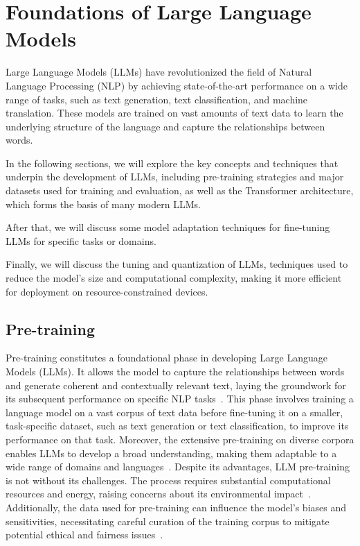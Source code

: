 
\section{Foundations of Large Language Models}
\label{ch:foundations-of-large-language-models}


Large Language Models (LLMs) have revolutionized the field of Natural Language Processing (NLP) by achieving state-of-the-art performance on a wide range of tasks, such as text generation, text classification, and machine translation.
These models are trained on vast amounts of text data to learn the underlying structure of the language and capture the relationships between words.

In the following sections, we will explore the key concepts and techniques that underpin the development of LLMs, including pre-training strategies and major datasets used for training and evaluation, as well as the Transformer architecture, which forms the basis of many modern LLMs.

After that, we will discuss some model adaptation techniques for fine-tuning LLMs for specific tasks or domains.

Finally, we will discuss the tuning and quantization of LLMs, techniques used to reduce the model's size and computational complexity, making it more efficient for deployment on resource-constrained devices.

\subsection{Pre-training}
\label{sec:pre-training}

Pre-training constitutes a foundational phase in developing Large Language Models (LLMs).
It allows the model to capture the relationships between words and generate coherent and contextually relevant text, laying the groundwork for its subsequent performance on specific NLP tasks~\cite{devlin2019bert, brown2020language}.
This phase involves training a language model on a vast corpus of text data before fine-tuning it on a smaller, task-specific dataset, such as text generation or text classification, to improve its performance on that task.
Moreover, the extensive pre-training on diverse corpora enables LLMs to develop a broad understanding, making them adaptable to a wide range of domains and languages~\cite{liu2019roberta, radford2019language}.
Despite its advantages, LLM pre-training is not without its challenges.
The process requires substantial computational resources and energy, raising concerns about its environmental impact~\cite{strubell2019energy}.
Additionally, the data used for pre-training can influence the model's biases and sensitivities, necessitating careful curation of the training corpus to mitigate potential ethical and fairness issues~\cite{bender2021dangers}.

